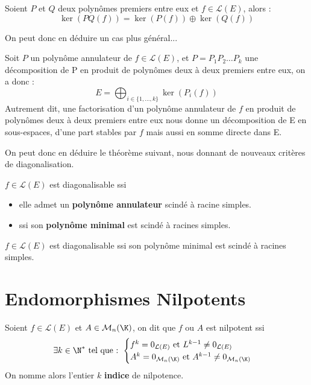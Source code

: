 \begin{lemma}[Noyaux]
    Soient $P$ et $Q$ deux polynômes premiers entre eux et $f \in \mathcal{L}(E)$, alors :
        \[ \boxed{\ker (PQ(f)) = \ker(P(f)) \oplus \ker(Q(f))} \] 
\end{lemma}

On peut donc en déduire un cas plus général... 

\begin{theorem}
    Soit $P$ un polynôme annulateur de $f \in \mathcal{L}(E)$, et $P = P_1P_2 \dots P_k$ une décomposition de P en produit de polynômes 
    deux à deux premiers entre eux, on a donc :
        \[E = \bigoplus_{i \in \{1,\dots, k\}} \ker (P_i(f))\]
    Autrement dit, une factorisation d'un polynôme annulateur de $f$ en produit de polynômes deux à deux premiers entre eux 
    nous donne un décomposition de E en sous-espaces, d'une part stables par $f$ mais aussi en somme directe dans E. 
\end{theorem}

On peut donc en déduire le théorème suivant, nous donnant de nouveaux critères de diagonalisation. 

\begin{theorem}
    $f \in \mathcal{L}(E)$ est diagonalisable ssi 
    \begin{itemize}
        \item elle admet un \textbf{polynôme annulateur} scindé à racine simples. 
        \item ssi son \textbf{polynôme minimal} est scindé à racines simples. 
    \end{itemize}
\end{theorem}

\begin{criteria}
    $f \in \mathcal{L}(E)$ est diagonalisable ssi son polynôme minimal est scindé à racines simples. 
\end{criteria}



\section{Endomorphismes Nilpotents}

\begin{definition}
    Soient $f \in \mathcal{L}(E)$ et $A \in \mathcal{M}_n(\K)$, on dit que $f$ ou $A$ est nilpotent ssi 
        \[ \exists k \in \N^* \text{ tel que : }
            \begin{cases}
                f^k = 0_{\mathcal{L}(E)} \text{ et } L^{k-1} \not = 0_{\mathcal{L}(E)} \\ 
                A^k = 0_{\mathcal{M}_n(\K)} \text{ et } A^{k-1} \not = 0_{\mathcal{M}_n(\K)}
            \end{cases}
        \]
    On nomme alors l'entier $k$ \textbf{indice} de nilpotence. 
\end{definition}


